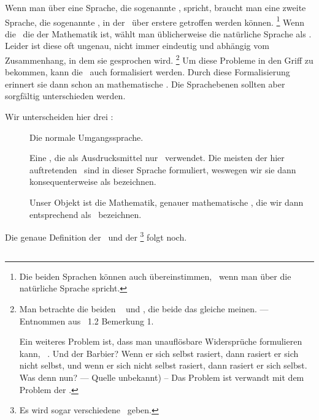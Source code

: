 Wenn man über eine Sprache, die sogenannte , spricht, braucht man eine zweite Sprache, die sogenannte , in der \Aussagen\ über erstere getroffen werden können.%
\footnote{%
	Die beiden Sprachen können auch übereinstimmen, \textzB\ wenn man über die natürliche Sprache spricht.
}
Wenn die \Objektsprache\ die der Mathematik ist, wählt man üblicherweise die natürliche Sprache als \Metasprache.
Leider ist diese oft ungenau, nicht immer eindeutig und abhängig vom Zusammenhang, in dem sie gesprochen wird.%
\footnote{%
	Man betrachte die beiden \Aussagen\  und , die beide das gleiche meinen.
	--- Entnommen aus \cite{bib:Rautenberg} \sectionname~1.2 Bemerkung 1.

	Ein weiteres Problem ist, dass man unauflösbare Widersprüche formulieren kann, \textzB\ .
	Und der Barbier?
	Wenn er sich selbst rasiert, dann rasiert er sich nicht selbst, und wenn er sich nicht selbst rasiert, dann rasiert er sich selbst.
	Was denn nun?
	--- Quelle unbekannt) --
	Das Problem ist verwandt mit dem Problem der .
}
Um diese Probleme in den Griff zu bekommen, kann die \Metasprache\ auch formalisiert werden.
Durch diese Formalisierung erinnert sie dann schon an mathematische \Formeln.
Die Sprachebenen sollten aber sorgfältig unterschieden werden.

Wir unterscheiden hier drei \Sprachebenen:
\begin{description}
	\item[\Metasprache] Die normale Umgangssprache.
	\item[\formaleMetasprache] Eine \Sprache, die als Ausdrucksmittel nur \Metasymbole\ verwendet.
	Die meisten der hier auftretenden \Formeln\ sind in dieser Sprache formuliert, weswegen wir sie dann konsequenterweise als  bezeichnen.
	\item[\Objektsprache] Unser Objekt ist die Mathematik, genauer mathematische \Formeln, die wir dann entsprechend als \Objektformeln\ bezeichnen.
\end{description}
Die genaue Definition der \formalenMetasprache\ und der \Objektsprache\footnote{Es wird sogar verschiedene \Objektsprachen\ geben.} folgt noch.

\subsection[Aussagen]{\Aussagen}%
\label  {sub-Aussagen}

